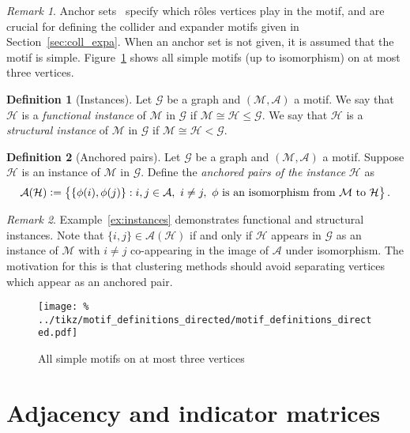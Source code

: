 \documentclass[12pt]{ociamthesis}
\theoremstyle{plain}
\theoremstyle{definition}
\newtheorem{definition}{Definition}[chapter]
\theoremstyle{remark}
\newtheorem*{remark}{Remark}
\newcommand\ca[1]{\mathcal{#1}}
\begin{document}
\begin{remark}
Anchor sets~\cite{benson2016higher} specify which r\^oles vertices play in
the motif, and are crucial for defining the collider and expander motifs
given in Section~\ref{sec:coll_expa}. When an anchor set is not given, it is
assumed that the motif is simple. Figure~\ref{fig:motif_definitions_directed}
shows all simple motifs (up to isomorphism) on at most three vertices.
\end{remark}

\begin{definition}[Instances]
Let $\ca{G}$ be a graph and $(\ca{M,A})$ a motif. We say that $\ca{H}$ is a
\emph{functional instance} of $\ca{M}$ in $\ca{G}$ if $\ca{M} \cong \ca{H}
\leq \ca{G}$. We say that $\ca{H}$ is a \emph{structural instance} of
$\ca{M}$ in $\ca{G}$ if $\ca{M} \cong \ca{H} < \ca{G}$.
\end{definition}

\begin{definition}[Anchored pairs]
Let $\ca{G}$ be a graph and $(\ca{M,A})$ a motif. Suppose $\ca{H}$ is an
instance of $\ca{M}$ in $\ca{G}$. Define the \emph{anchored pairs of the
instance} $\ca{H}$ as
$$ \ca{A(H)} \vcentcolon = \big\{ \{\phi(i),\phi(j)\} : i,j \in \ca{A}, \ i
\neq j, \ \phi \textrm{ is an isomorphism from } \ca{M} \textrm{ to } \ca{H}
\big\}\,.$$

\end{definition}

\begin{remark}
Example~\ref{ex:instances} demonstrates functional and structural instances.
Note that $\{i,j\} \in \ca{A(H)}$ if and only if $\ca{H}$ appears in $\ca{G}$
as an instance of $\ca{M}$ with $i \neq j$ co-appearing in the image of
$\ca{A}$ under isomorphism. The motivation for this is that clustering
methods should avoid separating vertices which appear as an anchored pair.
\end{remark}
%
\begin{figure}[H]
\centering
\texttt{[image: \%
../tikz/motif\_definitions\_directed/motif\_definitions\_directed.pdf]}
\caption{All simple motifs on at most three vertices}
\label{fig:motif_definitions_directed}
\end{figure}

\section{Adjacency and indicator matrices}
\label{sec:graphs_adj_and_ind_matrices}
\end{document}
